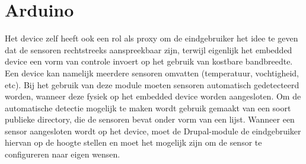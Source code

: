 \chapter{Arduino}

Het device zelf heeft ook een rol als proxy om de eindgebruiker het idee te geven dat de sensoren rechtstreeks aanspreekbaar zijn, terwijl eigenlijk het embedded device een vorm van controle invoert op het gebruik van kostbare bandbreedte.
Een device kan namelijk meerdere sensoren omvatten (temperatuur, vochtigheid, etc). Bij het gebruik van deze module moeten sensoren automatisch gedetecteerd worden, wanneer deze fysiek op het embedded device worden aangesloten. Om de automatische detectie mogelijk te maken wordt gebruik gemaakt van een soort publieke directory, die de sensoren bevat onder vorm van een lijst. Wanneer een sensor aangesloten wordt op het device, moet de Drupal-module de eindgebruiker hiervan op de hoogte stellen en moet het mogelijk zijn om de sensor te configureren naar eigen wensen.